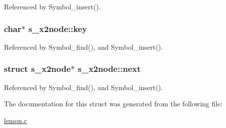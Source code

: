 Referenced by Symbol\-\_\-insert().

\hypertarget{structs__x2node_aba3c34d4d54ec3874153b7e317b883a5}{
\subsubsection[{key}]{\setlength{\rightskip}{0pt plus 5cm}char$\ast$ s\-\_\-x2node\-::key}}\label{structs__x2node_aba3c34d4d54ec3874153b7e317b883a5}


Referenced by Symbol\-\_\-find(), and Symbol\-\_\-insert().

\hypertarget{structs__x2node_ac9edb947528c1ce035c50b263a0211ab}{
\subsubsection[{next}]{\setlength{\rightskip}{0pt plus 5cm}struct {\bf s\-\_\-x2node}$\ast$ s\-\_\-x2node\-::next}}\label{structs__x2node_ac9edb947528c1ce035c50b263a0211ab}


Referenced by Symbol\-\_\-find(), and Symbol\-\_\-insert().



The documentation for this struct was generated from the following file\-:\begin{DoxyCompactItemize}
\item 
\hyperlink{lemon_8c}{lemon.\-c}\end{DoxyCompactItemize}
